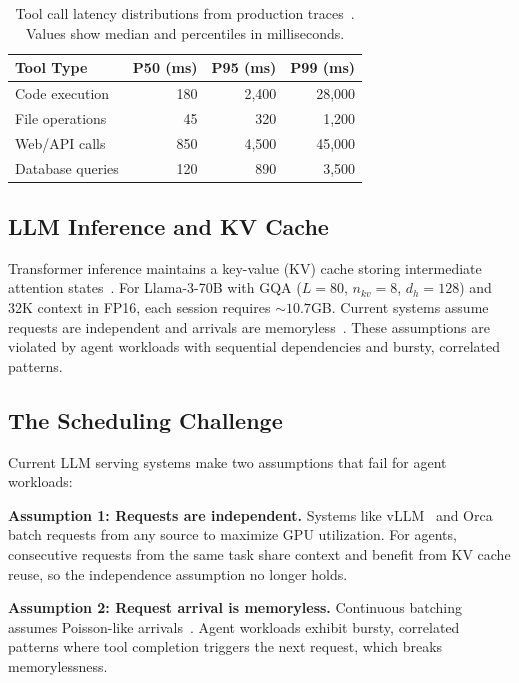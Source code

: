 \documentclass[sigconf]{acmart}
\begin{document}
\begin{table}[t]
    \centering
    \caption{Tool call latency distributions from production traces~\cite{wang2024burstgpt}. Values show median and percentiles in milliseconds.}
    \label{tab:tool-latency}
    \begin{tabular}{lrrr}
    \toprule
    \textbf{Tool Type} & \textbf{P50 (ms)} & \textbf{P95 (ms)} & \textbf{P99 (ms)} \\
    \midrule
    Code execution & 180 & 2,400 & 28,000 \\
    File operations & 45 & 320 & 1,200 \\
    Web/API calls & 850 & 4,500 & 45,000 \\
    Database queries & 120 & 890 & 3,500 \\
    \bottomrule
    \end{tabular}
\end{table}

\subsection{LLM Inference and KV Cache}
\label{sec:bg-kv}

Transformer inference maintains a key-value (KV) cache storing intermediate attention states~\cite{vaswani2017attention,dao2022flashattention}. For Llama-3-70B with GQA ($L{=}80$, $n_{kv}{=}8$, $d_h{=}128$) and 32K context in FP16, each session requires ${\sim}10.7$GB. Current systems assume requests are independent and arrivals are memoryless~\cite{kwon2023vllm,yu2022orca}. These assumptions are violated by agent workloads with sequential dependencies and bursty, correlated patterns.

\subsection{The Scheduling Challenge}
\label{sec:bg-challenge}

Current LLM serving systems make two assumptions that fail for agent workloads:

\textbf{Assumption 1: Requests are independent.} Systems like vLLM~\cite{kwon2023vllm} and Orca~\cite{yu2022orca} batch requests from any source to maximize GPU utilization. For agents, consecutive requests from the same task share context and benefit from KV cache reuse, so the independence assumption no longer holds.

\textbf{Assumption 2: Request arrival is memoryless.} Continuous batching assumes Poisson-like arrivals~\cite{yu2022orca}. Agent workloads exhibit bursty, correlated patterns where tool completion triggers the next request, which breaks memorylessness.
\end{document}
